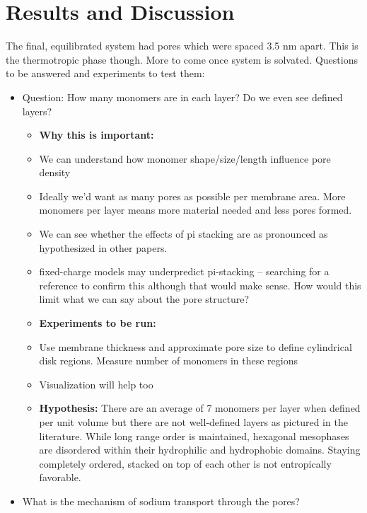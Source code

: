 \documentclass{article}
\begin{document}
	\section{Results and Discussion}
	
	The final, equilibrated system had pores which were spaced 3.5 nm apart. This is the thermotropic phase though. More to come once system is solvated. 
	\newline 
	\newline \noindent Questions to be answered and experiments to test them:
	
	\begin{itemize}
		\item Question: How many monomers are in each layer? Do we even see defined layers?
		\begin{itemize}
			\item \textbf{Why this is important:} 
				\item We can understand how monomer shape/size/length influence pore density
				\item Ideally we'd want as many pores as possible per membrane area. More monomers per layer means more material needed and less pores formed.
				\item We can see whether the effects of pi stacking are as pronounced as hypothesized in other papers.
					\item fixed-charge models may underpredict pi-stacking -- searching for a reference to confirm this although that would make sense. How would this limit what we can say about the pore structure?
			\item \textbf{Experiments to be run:}
				\item Use membrane thickness and approximate pore size to define cylindrical disk regions. Measure number of monomers in these regions
				\item Visualization will help too
			\item \textbf{Hypothesis:} There are an average of 7 monomers per layer when defined per unit volume but there are not well-defined layers as pictured in the literature. While long range order is maintained, hexagonal mesophases are disordered within their hydrophilic and hydrophobic domains. Staying completely ordered, stacked on top of each other is not entropically favorable.
		\end{itemize}
		\item What is the mechanism of sodium transport through the pores?
		\begin{itemize}

\end{itemize}
\end{itemize}
\end{document}
